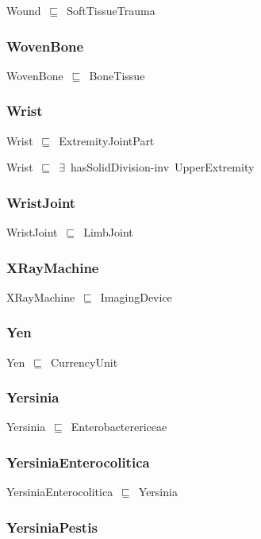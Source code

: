 \documentclass{article}
\begin{document}
Wound~\ensuremath{\sqsubseteq}~SoftTissueTrauma~

\subsubsection*{WovenBone}

WovenBone~\ensuremath{\sqsubseteq}~BoneTissue~

\subsubsection*{Wrist}

Wrist~\ensuremath{\sqsubseteq}~ExtremityJointPart~

Wrist~\ensuremath{\sqsubseteq}~\ensuremath{\exists}~hasSolidDivision-inv~UpperExtremity~

\subsubsection*{WristJoint}

WristJoint~\ensuremath{\sqsubseteq}~LimbJoint~

\subsubsection*{XRayMachine}

XRayMachine~\ensuremath{\sqsubseteq}~ImagingDevice~

\subsubsection*{Yen}

Yen~\ensuremath{\sqsubseteq}~CurrencyUnit~

\subsubsection*{Yersinia}

Yersinia~\ensuremath{\sqsubseteq}~Enterobacterericeae~

\subsubsection*{YersiniaEnterocolitica}

YersiniaEnterocolitica~\ensuremath{\sqsubseteq}~Yersinia~

\subsubsection*{YersiniaPestis}
\end{document}
